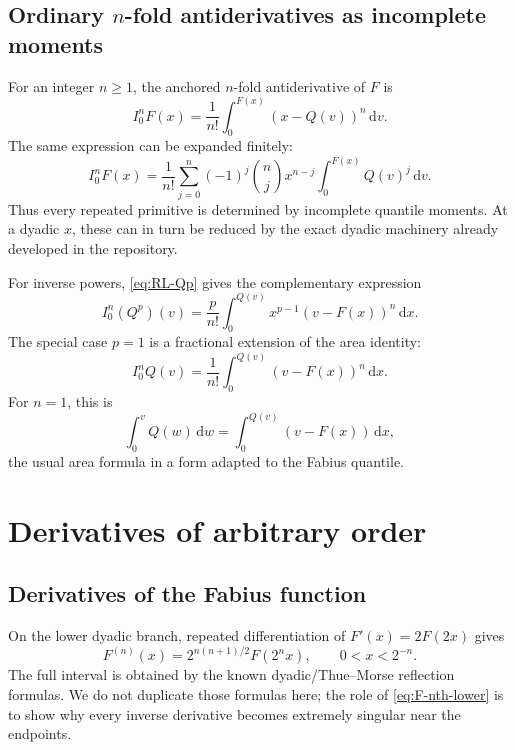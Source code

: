 \documentclass[11pt,oneside]{article}
\theoremstyle{definition}
\newcommand{\F}{F}
\newcommand{\Q}{Q}
\newcommand{\dd}{\,\mathrm d}
\begin{document}
\subsection{Ordinary \(n\)-fold antiderivatives as incomplete moments}

For an integer \(n\ge1\), the anchored \(n\)-fold antiderivative of \(\F\) is
\begin{equation}\label{eq:nth-F-primitive}
 I_0^n\F(x)=\frac1{n!}
 \int_0^{\F(x)}(x-\Q(v))^n\dd v.
\end{equation}
The same expression can be expanded finitely:
\begin{equation}\label{eq:nth-F-incomplete-moments}
 I_0^n\F(x)
 =\frac1{n!}\sum_{j=0}^n(-1)^j\binom njx^{n-j}
 \int_0^{\F(x)}\Q(v)^j\dd v.
\end{equation}
Thus every repeated primitive is determined by incomplete quantile moments.  At a dyadic
\(x\), these can in turn be reduced by the exact dyadic machinery already developed in
the repository.

For inverse powers, \cref{eq:RL-Qp} gives the complementary expression
\begin{equation}\label{eq:nth-Q-primitive}
 I_0^n(\Q^p)(v)
 =\frac{p}{n!}\int_0^{\Q(v)}x^{p-1}(v-\F(x))^n\dd x.
\end{equation}
The special case \(p=1\) is a fractional extension of the area identity:
\begin{equation}\label{eq:nth-Q-area}
 I_0^n\Q(v)=\frac1{n!}\int_0^{\Q(v)}(v-\F(x))^n\dd x.
\end{equation}
For \(n=1\), this is
\begin{equation}\label{eq:classic-inverse-area}
 \int_0^v\Q(w)\dd w=\int_0^{\Q(v)}(v-\F(x))\dd x,
\end{equation}
the usual area formula in a form adapted to the Fabius quantile.

\section{Derivatives of arbitrary order}

\subsection{Derivatives of the Fabius function}

On the lower dyadic branch, repeated differentiation of
\(\F'(x)=2\F(2x)\) gives
\begin{equation}\label{eq:F-nth-lower}
 \F^{(n)}(x)=2^{n(n+1)/2}\F(2^nx),
 \qquad 0<x<2^{-n}.
\end{equation}
The full interval is obtained by the known dyadic/Thue--Morse reflection formulas.
We do not duplicate those formulas here; the role of \cref{eq:F-nth-lower} is to show
why every inverse derivative becomes extremely singular near the endpoints.
\end{document}
